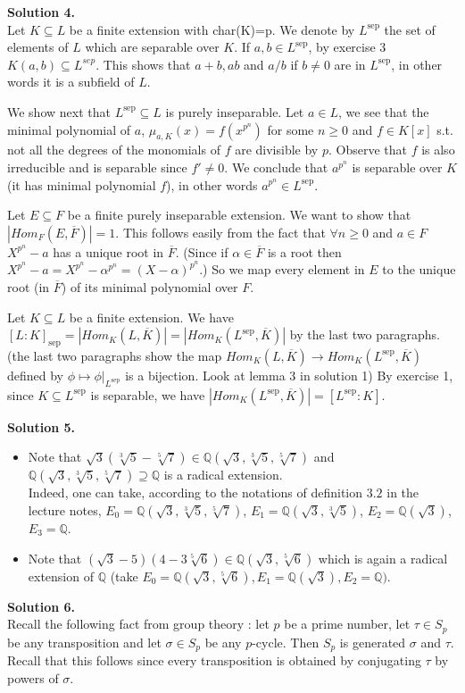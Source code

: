 \documentclass[12pt,a4paper]{article}
\begin{document}
\textbf{Solution 4. }\\

Let $K\subseteq L$ be a finite extension with char(K)=p. We denote by $L^{\text{sep}}$ the set of elements of $L$ which are separable over $K$. If $a,b\in L^{\text{sep}}$, by exercise 3 $K(a,b)\subseteq L^{sep}$. This shows that $a+b,ab$ and $a/b$ if $b\neq 0$ are in $L^{\text{sep}}$, in other words it is a subfield of $L$.

We show next that $L^{\text{sep}}\subseteq L$ is purely inseparable. Let $a\in L$, we see that the minimal polynomial of $a$, $\mu_{a,K}(x)=f(x^{p^n})$ for some $n\geq 0$ and $f\in K[x]$ s.t. not all the degrees of the monomials of $f$ are divisible by $p$. Observe that $f$ is also irreducible and is separable since $f'\neq 0$. We conclude that $a^{p^n}$ is separable over $K$ (it has minimal polynomial $f$), in other words $a^{p^n}\in L^{\text{sep}}$. 

Let $E\subseteq F$ be a finite purely inseparable extension. We want to show that $|Hom_F(E,\overline{F})|=1$. This follows easily from the fact that $\forall n\geq 0$ and $a\in F$ $X^{p^n}-a$ has a unique root in $\overline{F}$. (Since if $\alpha\in \overline{F}$ is a root then $X^{p^n}-a=X^{p^n}-\alpha^{p^n}=(X-\alpha)^{p^n}$.) So we map every element in $E$ to the unique root (in $\overline{F}$) of its minimal polynomial over $F$.

Let $K\subseteq L$ be a finite extension. We have $[L:K]_{\text{sep}}=|Hom_K(L,\overline{K})|=|Hom_K(L^{\text{sep}},\overline{K})|$ by the last two paragraphs. (the last two paragraphs show the map $Hom_K(L,\overline{K})\xrightarrow{} Hom_K(L^{\text{sep}},\overline{K})$ defined by $\phi \mapsto \phi|_{L^{\text{sep}}}$ is a bijection. Look at lemma 3 in solution 1) By exercise 1, since $K\subseteq L^{\text{sep}}$ is separable, we have $|Hom_K(L^{\text{sep}},\overline{K})|=[L^{\text{sep}}:K]$. 

\textbf{Solution 5.  }
	\begin{itemize}
		\item Note that $\sqrt{3}(\sqrt[3]{5} - \sqrt[5]{7}) \in \mathbb{Q}(\sqrt{3}, \sqrt[3]{5}, \sqrt[5]{7})$ and $\mathbb{Q}(\sqrt{3}, \sqrt[3]{5}, \sqrt[5]{7}) \supseteq \mathbb{Q}$ is a radical extension. \\ Indeed, one can take, according to the notations of definition $3.2$ in the lecture notes, $E_0 = \mathbb{Q}(\sqrt{3}, \sqrt[3]{5}, \sqrt[5]{7})$, $E_1 =  \mathbb{Q}(\sqrt{3}, \sqrt[3]{5})$, $E_2 = \mathbb{Q}(\sqrt{3})$, $E_3 = \mathbb{Q}$.
		\item Note that $(\sqrt{3} - 5)(4 - 3\sqrt[5]{6}) \in \mathbb{Q}(\sqrt{3}, \sqrt[5]{6})$ which is again a radical extension of $\mathbb{Q}$ (take $E_0 = \mathbb{Q}(\sqrt{3}, \sqrt[5]{6}), E_1 = \mathbb{Q}(\sqrt{3}), E_2 = \mathbb{Q})$.
	\end{itemize}
\textbf{Solution 6.} \\
Recall the following fact from group theory : let $p$ be a prime number, let $\tau \in S_p$ be any transposition and let $\sigma \in S_p$ be any $p$-cycle. Then $S_p$ is generated $\sigma$ and $\tau$. Recall that this follows since every transposition is obtained by conjugating $\tau$ by powers of $\sigma$. \\
\end{document}
